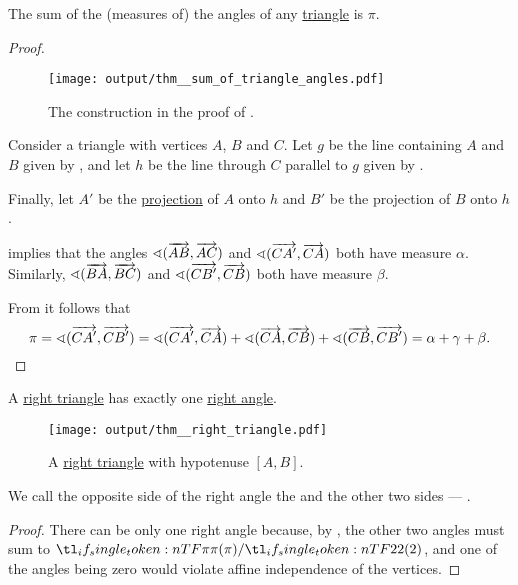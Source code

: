 \begin{proposition}\label{thm:sum_of_triangle_angles}
  The sum of the (measures of) the angles of any \hyperref[def:triangle]{triangle} is \( \pi \).
\end{proposition}
\begin{proof}
  \begin{figure}[!ht]
    \centering
    \texttt{[image: output/thm\_\_sum\_of\_triangle\_angles.pdf]}
    \caption{The construction in the proof of .}\label{fig:thm:sum_of_triangle_angles}
  \end{figure}

  Consider a triangle with vertices \( A \), \( B \) and \( C \). Let \( g \) be the line containing \( A \) and \( B \) given by , and let \( h \) be the line through \( C \) parallel to \( g \) given by .

  Finally, let \( A' \) be the \hyperref[def:orthogonal_projection]{projection} of \( A \) onto \( h \) and \( B' \) be the projection of \( B \) onto \( h \).

   implies that the angles \( \sphericalangle(\overrightarrow{AB}, \overrightarrow{AC}) \) and \( \sphericalangle(\overrightarrow{CA'}, \overrightarrow{CA}) \) both have measure \( \alpha \). Similarly, \( \sphericalangle(\overrightarrow{BA}, \overrightarrow{BC}) \) and \( \sphericalangle(\overrightarrow{CB'}, \overrightarrow{CB}) \) both have measure \( \beta \).

  From  it follows that
  \begin{equation*}
    \pi
    =
    \sphericalangle(\overrightarrow{CA'}, \overrightarrow{CB'})
    =
    \sphericalangle(\overrightarrow{CA'}, \overrightarrow{CA}) + \sphericalangle(\overrightarrow{CA}, \overrightarrow{CB}) + \sphericalangle(\overrightarrow{CB}, \overrightarrow{CB'})
    =
    \alpha + \gamma + \beta.
  \end{equation*}
\end{proof}

\begin{corollary}\label{thm:right_triangle}
  A \hyperref[def:triangle/right]{right triangle} has exactly one \hyperref[def:angle/measure/right]{right angle}.

  \begin{figure}[!ht]
    \centering
    \texttt{[image: output/thm\_\_right\_triangle.pdf]}
    \caption{A \hyperref[def:triangle/right]{right triangle} with hypotenuse \( [A, B] \).}\label{fig:thm:right_triangle}
  \end{figure}

  We call the opposite side of the right angle the  and the other two sides --- .
\end{corollary}
\begin{proof}
  There can be only one right angle because, by , the other two angles must sum to \( \ifrac \pi 2 \), and one of the angles being zero would violate affine independence of the vertices.
\end{proof}

